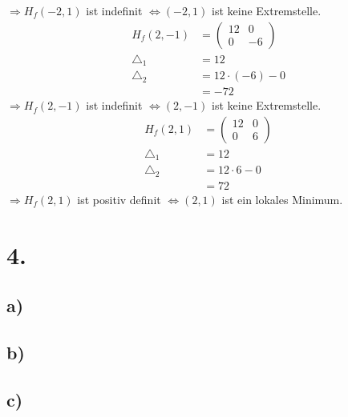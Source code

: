 \documentclass[a4paper]{scrartcl}
\begin{document}
\(\Rightarrow H_f(-2,1)\) ist indefinit \(\Leftrightarrow (-2,1)\) ist keine Extremstelle. \\
\begin{align}
H_f(2,-1) &= \begin{pmatrix}
12 & 0 \\
0 & -6
\end{pmatrix} \\
\triangle_1 &= 12 \\
\triangle_2 &= 12 \cdot (-6) -0 \\
	&= -72 
\end{align}
\(\Rightarrow H_f(2,-1)\) ist indefinit \(\Leftrightarrow (2,-1)\) ist keine Extremstelle. \\
\begin{align}
H_f(2,1) &= \begin{pmatrix}
12 & 0 \\
0 & 6
\end{pmatrix} \\
\triangle_1 &= 12 \\
\triangle_2 &= 12 \cdot 6 -0 \\
	&= 72 
\end{align}
\(\Rightarrow H_f(2,1)\) ist positiv definit \(\Leftrightarrow (2,1)\) ist ein lokales Minimum. \\


\newpage
\section{4.}
\subsection{a)}

\subsection{b)}

\subsection{c)}
\end{document}
